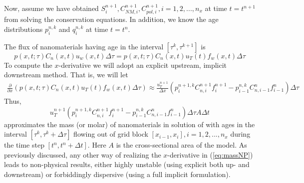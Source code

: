\documentclass[nanomaterials,article,submit,moreauthors,pdftex]{Definitions/mdpi}
\begin{document}
Now, assume we have obtained $S^{n+1}_{i}, C^{n+1}_{\textit{NM}, i}, C^{n+1}_{pol, i}, i=1,2,...,n_x$ at time $t=t^{n+1}$ from solving the conservation equations. In addition, we know the age distributions $p^{n,k}_i$ and $q^{n,k}_i$ at time $t=t^{n}$.

The flux of nanomaterials having age in the interval $\left[\tau^k, \tau^{k+1}\right]$ is
\begin{equation}
    p(x,t;\tau)C_n(x,t)u_w(x,t)\Delta\tau = p(x,t;\tau)C_n(x,t)u_T(t)f_w(x,t)\Delta\tau
\end{equation}
To compute the  $x$-derivative we will adopt an explicit upstream, implicit downstream method. That is, we will let
\begin{multline}
    \frac{\partial}{\partial x} \left(p(x,t;\tau)C_n(x,t)u_T(t)f_w(x,t)\Delta\tau\right) \approx \frac{u_T^{n+1}}{\Delta x} \left(p_i^{n+1,k}C_{n,i}^{n+1}f_i^{n+1}- p_{i-1}^{n,k}C_{n,i-1}^{n}f_{i-1}^{n}\right)\Delta\tau
\end{multline}
Thus,
\begin{equation} \label{eq:massNP} %
    u_T^{n+1} \left(p_i^{n+1,k}C_{n,i}^{n+1}f_i^{n+1}- p_{i-1}^{n,k}C_{n,i-1}^{n}f_{i-1}^{n}\right)\Delta\tau A\Delta t
\end{equation}
approximates the mass (or molar) of nanomaterials in solution of with ages in the interval $\left[\tau^k, \tau^k+\Delta\tau\right]$  flowing out of grid block $\left[x_{i-1},x_i\right],i=1,2,...,n_x$ during the time step  $\left[t^n, t^n+\Delta t\right]$. Here $A$ is the cross-sectional area of the model. As previously discussed, any other way of realizing the  $x$-derivative in (\ref{eq:massNP}) leads to non-physical results, either highly unstable (using explicit both up- and downstream) or forbiddingly dispersive (using a full implicit formulation). 
\end{document}
